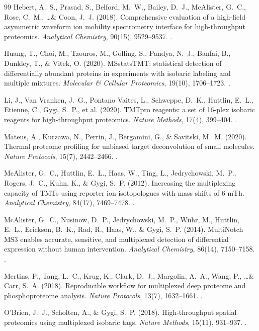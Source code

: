 \documentclass[11pt,oneside]{book}
\begin{document}
\begin{thebibliography}{99}
Hebert, A.~S., Prasad, S., Belford, M.~W., Bailey, D.~J., McAlister, G.~C., Rose, C.~M., \dots \& Coon, J.~J. (2018). Comprehensive evaluation of a high-field asymmetric waveform ion mobility spectrometry interface for high-throughput proteomics. \textit{Analytical Chemistry}, 90(15), 9529--9537. .

Huang, T., Choi, M., Tzouros, M., Golling, S., Pandya, N.~J., Banfai, B., Dunkley, T., \& Vitek, O. (2020). MSstatsTMT: statistical detection of differentially abundant proteins in experiments with isobaric labeling and multiple mixtures. \textit{Molecular \& Cellular Proteomics}, 19(10), 1706--1723. .

Li, J., Van Vranken, J.~G., Pontano Vaites, L., Schweppe, D.~K., Huttlin, E.~L., Etienne, C., Gygi, S.~P., et al. (2020). TMTpro reagents: a set of 16-plex isobaric reagents for high-throughput proteomics. \textit{Nature Methods}, 17(4), 399--404. .

Mateus, A., Kurzawa, N., Perrin, J., Bergamini, G., \& Savitski, M.~M. (2020). Thermal proteome profiling for unbiased target deconvolution of small molecules. \textit{Nature Protocols}, 15(7), 2442--2466. .

McAlister, G.~C., Huttlin, E.~L., Haas, W., Ting, L., Jedrychowski, M.~P., Rogers, J.~C., Kuhn, K., \& Gygi, S.~P. (2012). Increasing the multiplexing capacity of TMTs using reporter ion isotopologues with mass shifts of 6 mTh. \textit{Analytical Chemistry}, 84(17), 7469--7478. .

McAlister, G.~C., Nusinow, D.~P., Jedrychowski, M.~P., W{\"u}hr, M., Huttlin, E.~L., Erickson, B.~K., Rad, R., Haas, W., \& Gygi, S.~P. (2014). MultiNotch MS3 enables accurate, sensitive, and multiplexed detection of differential expression without human intervention. \textit{Analytical Chemistry}, 86(14), 7150--7158. .

Mertins, P., Tang, L.~C., Krug, K., Clark, D.~J., Margolin, A.~A., Wang, P., \dots \& Carr, S.~A. (2018). Reproducible workflow for multiplexed deep proteome and phosphoproteome analysis. \textit{Nature Protocols}, 13(7), 1632--1661. .

O'Brien, J.~J., Scholten, A., \& Gygi, S.~P. (2018). High-throughput spatial proteomics using multiplexed isobaric tags. \textit{Nature Methods}, 15(11), 931--937. .


\end{thebibliography}
\end{document}

